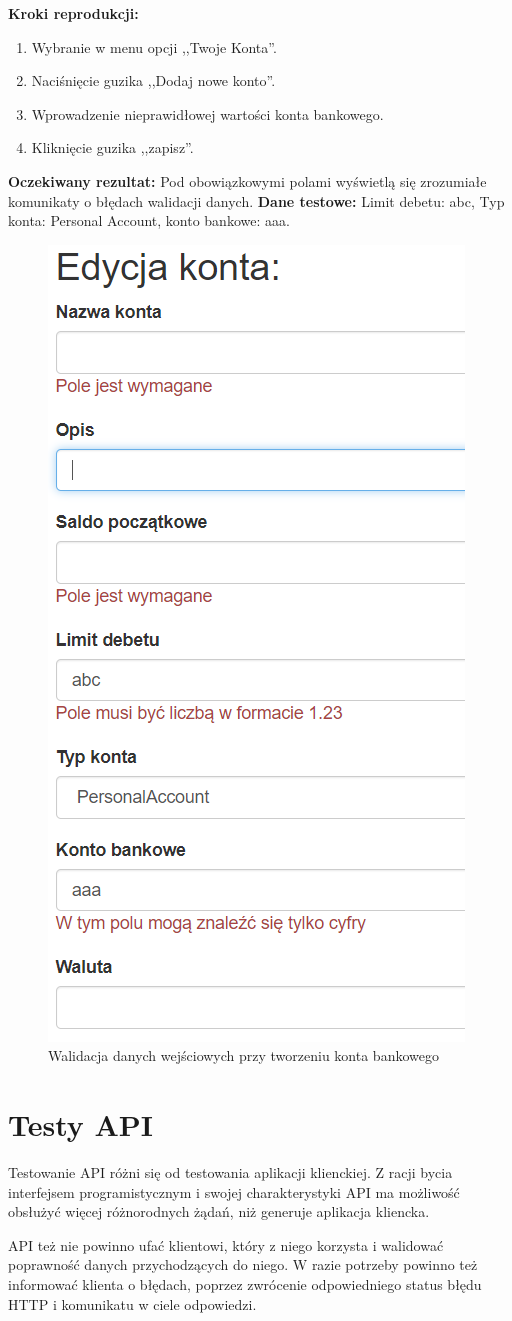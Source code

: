 \begin{enumerate}[labelwidth=1em,label=\Roman*]
    \textbf{Kroki reprodukcji:}  \begin{enumerate}[label=\arabic*.]
        \item Wybranie w menu opcji ,,Twoje Konta''.
        \item Naciśnięcie guzika ,,Dodaj nowe konto''.
        \item Wprowadzenie nieprawidłowej wartości konta bankowego.
        \item Kliknięcie guzika ,,zapisz''.
    \end{enumerate}
    \textbf{Oczekiwany rezultat:}  Pod obowiązkowymi polami wyświetlą się zrozumiałe komunikaty o błędach walidacji danych. \newline
    \textbf{Dane testowe:} Limit debetu: abc, Typ konta: Personal Account, konto bankowe: aaa.
\end{enumerate}

\begin{figure}[t]
	\centering
	\includegraphics[width=.35\linewidth]{rys05/validation-client-1.PNG}
	\caption{Walidacja danych wejściowych przy tworzeniu konta bankowego}
	\label{fig:client-test-1}
\end{figure}

\section{Testy API}
\label{sec:test-api}

Testowanie API różni się od testowania aplikacji klienckiej. Z racji bycia interfejsem programistycznym i swojej charakterystyki API ma możliwość obsłużyć więcej różnorodnych żądań, niż generuje aplikacja kliencka. 

API też nie powinno ufać klientowi, który z niego korzysta i walidować poprawność danych przychodzących do niego. W razie potrzeby powinno też informować klienta o błędach, poprzez zwrócenie odpowiedniego status błędu HTTP i komunikatu w ciele odpowiedzi.

